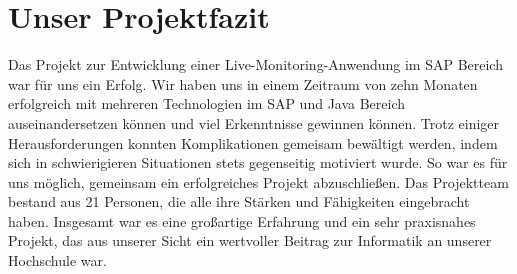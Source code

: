 \section*{Unser Projektfazit}
Das Projekt zur Entwicklung einer Live-Monitoring-Anwendung im SAP Bereich war für uns ein Erfolg. Wir haben uns in einem Zeitraum von zehn Monaten erfolgreich mit mehreren Technologien im SAP und Java Bereich auseinandersetzen können und viel Erkenntnisse gewinnen können.
\newline
\newline
Trotz einiger Herausforderungen konnten Komplikationen gemeisam bewältigt werden, indem sich in schwierigieren Situationen stets gegenseitig motiviert wurde. So war es für uns möglich, gemeinsam ein erfolgreiches Projekt abzuschließen.
\newline
\newline
Das Projektteam bestand aus 21 Personen, die alle ihre Stärken und Fähigkeiten eingebracht haben. Insgesamt war es eine großartige Erfahrung und ein sehr praxisnahes Projekt, das aus unserer Sicht ein wertvoller Beitrag zur Informatik an unserer Hochschule war.

